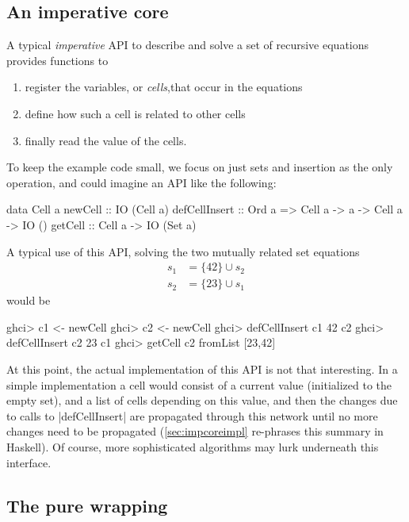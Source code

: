 \documentclass[manuscript,review,screen,acmsmall]{acmart}
\begin{document}
\subsection{An imperative core}\label{sec:impcore}

A typical \emph{imperative} API to describe and solve a set of recursive equations provides functions to
\begin{enumerate}
\item register the variables, or \emph{cells},that occur in the equations
\item define how such a cell is related to other cells
\item finally read the value of the cells.
\end{enumerate}
To keep the example code small, we focus on just sets and insertion as the only operation, and could imagine an API like the following:

\begin{minipage}{\linewidth}
\begin{code}
data Cell a
newCell        ::                                      IO (Cell a)
defCellInsert  ::  Ord a =>  Cell a -> a -> Cell a ->  IO ()
getCell        ::            Cell a ->                 IO (Set a)
\end{code}
\end{minipage}

A typical use of this API, solving the two mutually related set equations
\begin{align*}
s_1 &= \{ 42 \} \cup s_2 \\
s_2 &= \{ 23 \} \cup s_1
\end{align*}
would be
\begin{code}
ghci> c1 <- newCell
ghci> c2 <- newCell
ghci> defCellInsert c1 42 c2
ghci> defCellInsert c2 23 c1
ghci> getCell c2
fromList [23,42]
\end{code}

At this point, the actual implementation of this API is not that interesting. In a simple implementation a cell would consist of a current value (initialized to the empty set), and a list of cells depending on this value, and then the changes due to calls to |defCellInsert| are propagated through this network until no more changes need to be propagated (\cref{sec:impcoreimpl} re-phrases this summary in Haskell). Of course, more sophisticated algorithms may lurk underneath this interface.

\subsection{The pure wrapping}
\end{document}
